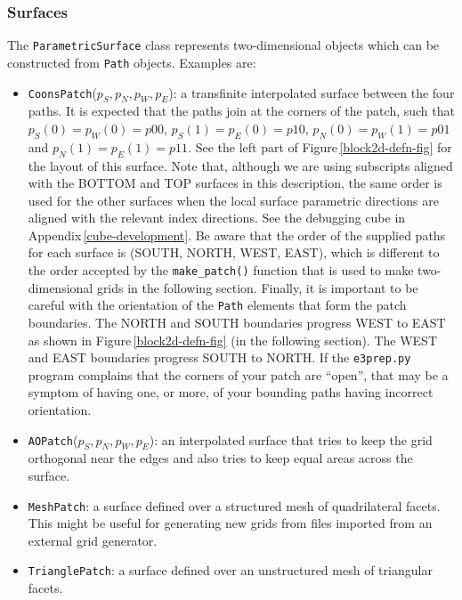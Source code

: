 \documentclass[12pt,a4paper,twoside]{article}
\begin{document}
\subsubsection{Surfaces}
%
The \texttt{ParametricSurface} class 
represents two-dimensional objects which can be constructed from \texttt{Path} objects.
Examples are:
\begin{itemize}
\item \texttt{CoonsPatch}($p_S, p_N, p_W, p_E$): a transfinite interpolated
  surface between the four paths.
  It is expected that the paths join at the corners of the patch, such that
  $p_S(0) = p_W(0) = p00$, $p_S(1) = p_E(0) = p10$, $p_N(0) = p_W(1) = p01$ and $p_N(1) =  p_E(1) = p11$.
  See the left part of Figure\,\ref{block2d-defn-fig} for the layout of this surface.
  Note that, although we are using subscripts aligned with the BOTTOM and TOP
  surfaces in this description, the same order is used for the other surfaces
  when the local surface parametric directions are aligned with the relevant index
  directions.
  See the debugging cube in Appendix\,\ref{cube-development}.
  Be aware that the order of the supplied paths for each surface is (SOUTH, NORTH, WEST, EAST),
  which is different to the order accepted by the \texttt{make\_patch()} function 
  that is used to make two-dimensional grids in the following section.  
  Finally, it is important to be careful with the orientation of the \texttt{Path}
  elements that form the patch boundaries.
  The NORTH and SOUTH boundaries progress WEST to EAST as shown in Figure\,\ref{block2d-defn-fig}
  (in the following section).
  The WEST and EAST boundaries progress SOUTH to NORTH.
  If the \texttt{e3prep.py} program complains that the corners of your patch are ``open'',
  that may be a symptom of having one, or more, of your bounding paths having incorrect orientation.
\item \texttt{AOPatch}($p_S, p_N, p_W, p_E$): an interpolated surface 
  that tries to keep the grid orthogonal near the edges and 
  also tries to keep equal areas across the surface.
\item \texttt{MeshPatch}: a surface defined over a structured mesh of
  quadrilateral facets.
  This might be useful for generating new grids from files imported from
  an external grid generator.
\item \texttt{TrianglePatch}: a surface defined over an unstructured mesh of
  triangular facets.

\end{itemize}
\end{document}
